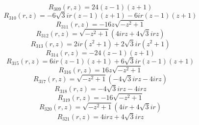 \documentclass[11pt,a4paper]{article}
\begin{document}
\begin{equation}
R_{309}(r,z)=24 \left(z - 1\right) \left(z + 1\right)
\label{eq:cat-rational-309}
\end{equation}
\begin{equation}
R_{310}(r,z)=- 6 \sqrt{3} i r \left(z - 1\right) \left(z + 1\right) - 6 i r \left(z - 1\right) \left(z + 1\right)
\label{eq:cat-rational-310}
\end{equation}
\begin{equation}
R_{311}(r,z)=- 16 z \sqrt{- z^{2} + 1}
\label{eq:cat-rational-311}
\end{equation}
\begin{equation}
R_{312}(r,z)=\sqrt{- z^{2} + 1} \left(4 i r z + 4 \sqrt{3} i r z\right)
\label{eq:cat-rational-312}
\end{equation}
\begin{equation}
R_{313}(r,z)=2 i r \left(z^{2} + 1\right) + 2 \sqrt{3} i r \left(z^{2} + 1\right)
\label{eq:cat-rational-313}
\end{equation}
\begin{equation}
R_{314}(r,z)=- 24 \left(z - 1\right) \left(z + 1\right)
\label{eq:cat-rational-314}
\end{equation}
\begin{equation}
R_{315}(r,z)=6 i r \left(z - 1\right) \left(z + 1\right) + 6 \sqrt{3} i r \left(z - 1\right) \left(z + 1\right)
\label{eq:cat-rational-315}
\end{equation}
\begin{equation}
R_{316}(r,z)=16 z \sqrt{- z^{2} + 1}
\label{eq:cat-rational-316}
\end{equation}
\begin{equation}
R_{317}(r,z)=\sqrt{- z^{2} + 1} \left(- 4 \sqrt{3} i r z - 4 i r z\right)
\label{eq:cat-rational-317}
\end{equation}
\begin{equation}
R_{318}(r,z)=- 4 \sqrt{3} i r z - 4 i r z
\label{eq:cat-rational-318}
\end{equation}
\begin{equation}
R_{319}(r,z)=- 16 \sqrt{- z^{2} + 1}
\label{eq:cat-rational-319}
\end{equation}
\begin{equation}
R_{320}(r,z)=\sqrt{- z^{2} + 1} \left(4 i r + 4 \sqrt{3} i r\right)
\label{eq:cat-rational-320}
\end{equation}
\begin{equation}
R_{321}(r,z)=4 i r z + 4 \sqrt{3} i r z
\label{eq:cat-rational-321}
\end{equation}
\end{document}
